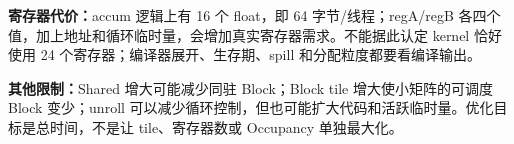 \textbf{寄存器代价：}accum 逻辑上有 16 个 float，即 64 字节/线程；regA/regB 各四个值，加上地址和循环临时量，会增加真实寄存器需求。不能据此认定 kernel 恰好使用 24 个寄存器；编译器展开、生存期、spill 和分配粒度都要看编译输出。

\textbf{其他限制：}Shared 增大可能减少同驻 Block；Block tile 增大使小矩阵的可调度 Block 变少；unroll 可以减少循环控制，但也可能扩大代码和活跃临时量。优化目标是总时间，不是让 tile、寄存器数或 Occupancy 单独最大化。
\pagebreakhere
